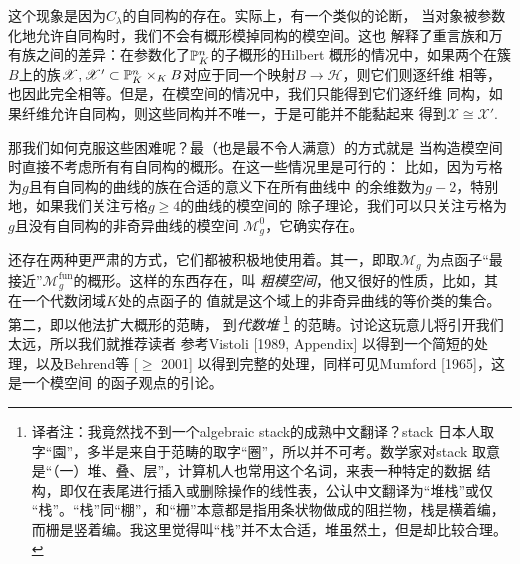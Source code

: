 这个现象是因为$C_\lambda$的自同构的存在。实际上，有一个类似的论断，
当对象被参数化地允许自同构时，我们不会有概形模掉同构的模空间。这也
解释了重言族和万有族之间的差异：在参数化了$\P_K^n$的子概形的Hilbert
概形的情况中，如果两个在簇$B$上的族$\mathscr X,\mathscr X'\subset 
\P_K^n\times_K B$对应于同一个映射$B\to \mathscr H$，则它们则逐纤维
相等，也因此完全相等。但是，在模空间的情况中，我们只能得到它们逐纤维
同构，如果纤维允许自同构，则这些同构并不唯一，于是可能并不能黏起来
得到$\mathscr X\cong \mathscr X'$.

那我们如何克服这些困难呢？最\naive（也是最不令人满意）的方式就是
当构造模空间时直接不考虑所有有自同构的概形。在这一些情况里是可行的：
比如，因为亏格为$g$且有自同构的曲线的族在合适的意义下在所有曲线中
的余维数为$g-2$，特别地，如果我们关注亏格$g\geq 4$的曲线的模空间的
除子理论，我们可以只关注亏格为$g$且没有自同构的非奇异曲线的模空间
$\mathscr M_g^0$，它确实存在。

还存在两种更严肃的方式，它们都被积极地使用着。其一，即取$\mathscr M_g$
为点函子“最接近”$\mathscr M_g^{\text{fun}}$的概形。这样的东西存在，叫
\emph{粗模空间}，他又很好的性质，比如，其在一个代数闭域$K$处的点函子的
值就是这个域上的非奇异曲线的等价类的集合。第二，即以他法扩大概形的范畴，
到\emph{代数堆}%
\footnote{译者注：我竟然找不到一个algebraic stack的成熟中文翻译？stack
日本人取字“園”，多半是来自于范畴的取字“圈”，所以并不可考。数学家对stack
取意是“（一）堆、叠、层”，计算机人也常用这个名词，来表一种特定的数据
结构，即仅在表尾进行插入或删除操作的线性表，公认中文翻译为“堆栈”或仅
“栈”。“栈”同“棚”，和“栅”本意都是指用条状物做成的阻拦物，栈是横着编，
而栅是竖着编。我这里觉得叫“栈”并不太合适，堆虽然土，但是却比较合理。
}%
的范畴。讨论这玩意儿将引开我们太远，所以我们就推荐读者%
参考Vistoli [1989, Appendix] 以得到一个简短的处理，以及Behrend等
[$\geq$ 2001] 以得到完整的处理，同样可见Mumford [1965]，这是一个模空间
的函子观点的引论。